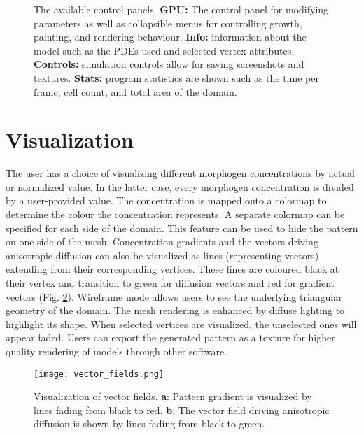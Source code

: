 \begin{figure}[p]
	\centering
	\caption{The available control panels. \textbf{GPU:} The control panel for modifying parameters as well as collapsible menus for controlling growth, painting, and rendering behaviour. \textbf{Info:} information about the model such as the PDEs used and selected vertex attributes. \textbf{Controls:} simulation controls allow for saving screenshots and textures. \textbf{Stats:} program statistics are shown such as the time per frame, cell count, and total area of the domain.} 
	\label{fig:GUIexample}
\end{figure}

\section{Visualization}
The user has a choice of visualizing different morphogen concentrations by actual or normalized value. In the latter case, every morphogen concentration is divided by a user-provided value. The concentration is mapped onto a colormap to determine the colour the concentration represents. A separate colormap can be specified for each side of the domain. This feature can be used to hide the pattern on one side of the mesh. Concentration gradients and the vectors driving anisotropic diffusion can also be visualized as lines (representing vectors) extending from their corresponding vertices. These lines are coloured black at their vertex and transition to green for diffusion vectors and red for gradient vectors (Fig. \ref{fig:vector_fields}). Wireframe mode allows users to see the underlying triangular geometry of the domain. The mesh rendering is enhanced by diffuse lighting to highlight its shape. When selected vertices are visualized, the unselected ones will appear faded. Users can export the generated pattern as a texture for higher quality rendering of models through other software.

\begin{figure}[ht]
	\centering
	\texttt{[image: vector\_fields.png]}	
	\caption{Visualization of vector fields. \textbf{a}: Pattern gradient is visualized by lines fading from black to red. \textbf{b}: The vector field driving anisotropic diffusion is shown by lines fading from black to green.} 
	\label{fig:vector_fields}
\end{figure}

